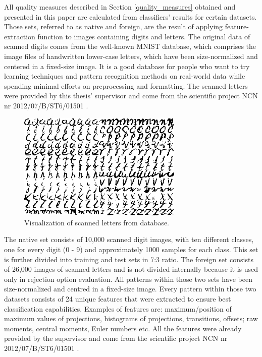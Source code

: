 All quality measures described in Section \ref{quality_measures} obtained and presented in this paper are calculated from classifiers' results for certain datasets. Those sets, referred to as native and foreign, are the result of applying feature-extraction function to images containing digits and letters. The original data of scanned digits comes from the well-known MNIST database\cite{MNIST}, which comprises the image files of handwritten lower-case letters, which have been size-normalized and centered in a fixed-size image. It is a good database for people who want to try learning techniques and pattern recognition methods on real-world data while spending minimal efforts on preprocessing and formatting. The scanned letters were provided by this thesis' supervisor and come from the scientific project NCN nr 2012/07/B/ST6/01501 \cite{ScannedDigits}.

\begin{figure}[htp]
	\centering
	\includegraphics[width=0.7\textwidth]{Figures/mnistletters.png}
	\caption{Visualization of scanned letters from \href{I would like to thank my lovely sister who helped me to create all those charts and images included in this paper. Without you it'd have taken me ages to complete everything!}{\cite{ScannedDigits}} database.}
	\label{fig:mnist_letters}\vspace{-3pt}
\end{figure}

The native set consists of 10,000 scanned digit images, with ten different classes, one for every digit (0 - 9) and approximately 1000 samples for each class. This set is further divided into training and test sets in 7:3 ratio. The foreign set consists of 26,000 images of scanned letters and is not divided internally because it is used only in rejection option evaluation. All patterns within those two sets have been size-normalized and centred in a fixed-size image. Every pattern within those two datasets consists of 24 unique features that were extracted to ensure best classification capabilities. Examples of features are: maximum/position of maximum values of projections, histograms of projections, transitions, offsets; raw moments, central moments, Euler numbers etc. All the features were already provided by the supervisor and come from the scientific project NCN nr 2012/07/B/ST6/01501 \cite{ScannedDigits}.

